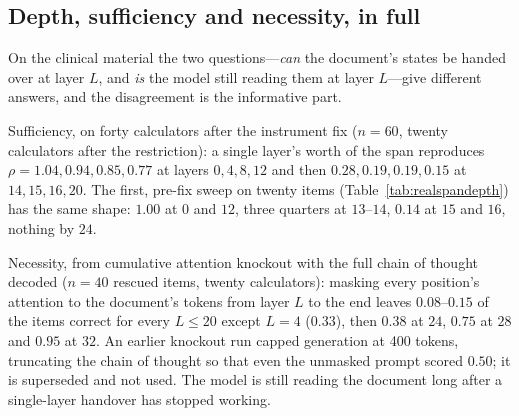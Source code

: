 \documentclass{article}
\begin{document}
\subsection{Depth, sufficiency and necessity, in full}
\label{app:depth}

\begin{table}[h]
\caption{Centred participation ratio of the content matrix across the
document's span on Qwen3-8B, measured four ways, medians over $96$ items from
all $48$ documents (the plain column is bimodal, so its mean describes no
item). The first column is the quantity usually reported and the only one that
collapses. The last two columns say why---they are properties of the state
itself, not of the difference: at layer $16$ one token in $35$ of $48$
documents acquires a state $153$ times (median) the span's norm, carried by two
fixed hidden dimensions, and the top eight dimensions then hold $98\%$ of the
variance. Removing four positions out of four hundred, or normalising each
position to unit length, removes the collapse entirely.}
\label{tab:prdiag}
\centering
\small
\setlength{\tabcolsep}{4pt}

\end{table}


On the clinical material the two questions---\emph{can} the document's states be
handed over at layer $L$, and \emph{is} the model still reading them at layer
$L$---give different answers, and the disagreement is the informative part.

Sufficiency, on forty calculators after the instrument fix ($n=60$, twenty
calculators after the restriction): a single layer's worth of the span reproduces
$\rho = 1.04, 0.94, 0.85, 0.77$ at layers $0, 4, 8, 12$ and then
$0.28, 0.19, 0.19, 0.15$ at $14, 15, 16, 20$. The first, pre-fix sweep on twenty
items (Table~\ref{tab:realspandepth}) has the same shape: $1.00$ at $0$ and $12$,
three quarters at $13$--$14$, $0.14$ at $15$ and $16$, nothing by $24$.

Necessity, from cumulative attention knockout with the full chain of thought
decoded ($n=40$ rescued items, twenty calculators): masking every position's
attention to the document's tokens from layer $L$ to the end leaves
$0.08$--$0.15$ of the items correct for every $L \le 20$ except $L=4$ ($0.33$),
then $0.38$ at $24$, $0.75$ at $28$ and $0.95$ at $32$. An earlier knockout run
capped generation at 400 tokens, truncating the chain of thought so that even the
unmasked prompt scored $0.50$; it is superseded and not used. The model is still
reading the document long after a single-layer handover has stopped working.
\end{document}
